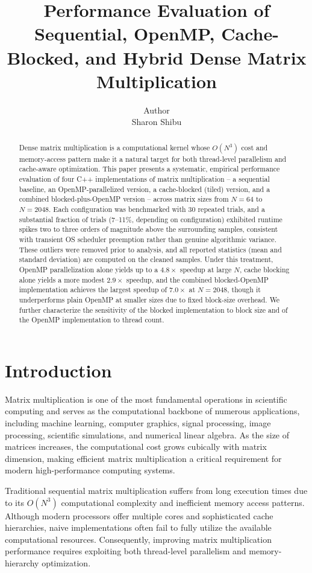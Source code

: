 \documentclass[11pt]{article}
\title{Performance Evaluation of Sequential, OpenMP, Cache-Blocked, and Hybrid Dense Matrix Multiplication}
\author{Author\\ \small{Sharon Shibu}}
\date{}
\begin{document}
\maketitle

\begin{abstract}
Dense matrix multiplication is a computational kernel whose $O(N^3)$ cost and memory-access pattern make it a natural target for both thread-level parallelism and cache-aware optimization. This paper presents a systematic, empirical performance evaluation of four C++ implementations of matrix multiplication -- a sequential baseline, an OpenMP-parallelized version, a cache-blocked (tiled) version, and a combined blocked-plus-OpenMP version -- across matrix sizes from $N=64$ to $N=2048$. Each configuration was benchmarked with 30 repeated trials, and a substantial fraction of trials (7--11\%, depending on configuration) exhibited runtime spikes two to three orders of magnitude above the surrounding samples, consistent with transient OS scheduler preemption rather than genuine algorithmic variance. These outliers were removed prior to analysis, and all reported statistics (mean and standard deviation) are computed on the cleaned samples. Under this treatment, OpenMP parallelization alone yields up to a $4.8\times$ speedup at large $N$, cache blocking alone yields a more modest $2.9\times$ speedup, and the combined blocked-OpenMP implementation achieves the largest speedup of $7.0\times$ at $N=2048$, though it underperforms plain OpenMP at smaller sizes due to fixed block-size overhead. We further characterize the sensitivity of the blocked implementation to block size and of the OpenMP implementation to thread count.
\end{abstract}

\section{Introduction}
\label{sec:intro}

Matrix multiplication is one of the most fundamental operations in scientific computing and serves as the computational backbone of numerous applications, including machine learning, computer graphics, signal processing, image processing, scientific simulations, and numerical linear algebra. As the size of matrices increases, the computational cost grows cubically with matrix dimension, making efficient matrix multiplication a critical requirement for modern high-performance computing systems.

Traditional sequential matrix multiplication suffers from long execution times due to its $O(N^3)$ computational complexity and inefficient memory access patterns. Although modern processors offer multiple cores and sophisticated cache hierarchies, naive implementations often fail to fully utilize the available computational resources. Consequently, improving matrix multiplication performance requires exploiting both thread-level parallelism and memory-hierarchy optimization.
\end{document}

